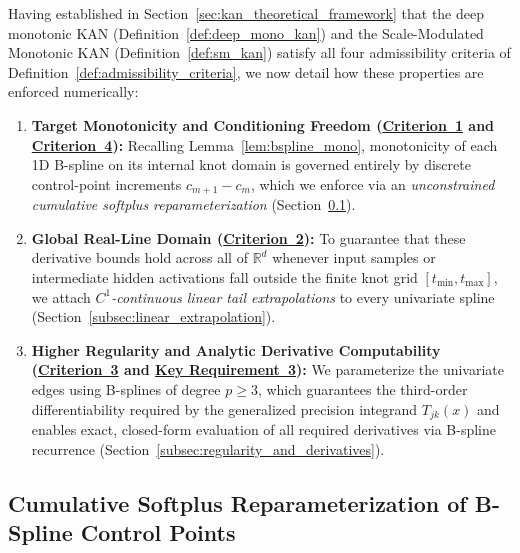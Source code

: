 \documentclass[11pt,a4paper]{article}
\theoremstyle{plain}
\theoremstyle{definition}
\theoremstyle{remark}
\begin{document}
Having established in Section~\ref{sec:kan_theoretical_framework} that the deep monotonic KAN (Definition~\ref{def:deep_mono_kan}) and the Scale-Modulated Monotonic KAN (Definition~\ref{def:sm_kan}) satisfy all four admissibility criteria of Definition~\ref{def:admissibility_criteria}, we now detail how these properties are enforced numerically:
\begin{enumerate}
    \item \textbf{Target Monotonicity and Conditioning Freedom (\hyperref[crit:target_monotonicity]{Criterion~1} and \hyperref[crit:conditioning_freedom]{Criterion~4}):} Recalling Lemma~\ref{lem:bspline_mono}, monotonicity of each 1D B-spline on its internal knot domain is governed entirely by discrete control-point increments $c_{m+1} - c_m$, which we enforce via an \emph{unconstrained cumulative softplus reparameterization} (Section~\ref{subsec:softplus_reparam}).
    \item \textbf{Global Real-Line Domain (\hyperref[crit:global_domain]{Criterion~2}):} To guarantee that these derivative bounds hold across all of $\mathbb{R}^d$ whenever input samples or intermediate hidden activations fall outside the finite knot grid $[t_{\min}, t_{\max}]$, we attach \emph{$C^1$-continuous linear tail extrapolations} to every univariate spline (Section~\ref{subsec:linear_extrapolation}).
    \item \textbf{Higher Regularity and Analytic Derivative Computability (\hyperref[crit:c3_smoothness]{Criterion~3} and \hyperref[req:key_requirement_3]{Key Requirement~3}):} We parameterize the univariate edges using B-splines of degree $p \ge 3$, which guarantees the third-order differentiability required by the generalized precision integrand $T_{jk}(x)$ and enables exact, closed-form evaluation of all required derivatives via B-spline recurrence (Section~\ref{subsec:regularity_and_derivatives}).
\end{enumerate}

\subsection{Cumulative Softplus Reparameterization of B-Spline Control Points}
\label{subsec:softplus_reparam}
\end{document}
